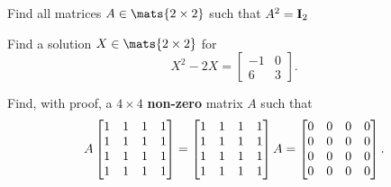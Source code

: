 \begin{pro}Find all matrices $A\in\mats{2\times 2}$ such that $A^2 = {\bf I}_2$
\end{pro}

\begin{pro}
Find a solution $X\in\mats{2\times 2}$ for
$$X^2 - 2X = \left[\begin{array}{rl} -1 & 0 \\ 6 & 3\end{array}\right].$$
\end{pro}
\begin{pro}
Find, with proof, a $4\times 4$ {\bf non-zero} matrix $A$ such that
$$A\begin{bmatrix}1 & 1 & 1 & 1 \cr 1 & 1 & 1 & 1 \cr 1 & 1 & 1 & 1 \cr 1 & 1 & 1 & 1 \cr \end{bmatrix} = \begin{bmatrix}1 & 1 & 1 & 1 \cr 1 & 1 & 1 & 1 \cr 1 & 1 & 1 & 1 \cr 1 & 1 & 1 & 1 \cr \end{bmatrix}A =
\begin{bmatrix}0 & 0 & 0 & 0 \cr 0 & 0 & 0 & 0 \cr 0 & 0 & 0 & 0 \cr 0 & 0 & 0 & 0 \cr \end{bmatrix}.
$$
\end{pro}
